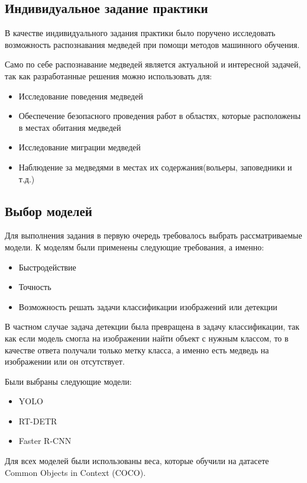 \documentclass[../document.tex]{subfiles}
\begin{document}
    \subsection{Индивидуальное задание практики}
    \par В качестве индивидуального задания практики было поручено исследовать возможность распознавания медведей при помощи методов машинного обучения.
    \par Само по себе распознавание медведей является актуальной и интересной задачей, так как разработанные решения можно использовать для:
    \begin{itemize}
    	\item Исследование поведения медведей
    	\item Обеспечение безопасного проведения работ в областях, которые расположены в местах обитания медведей
    	\item Исследование миграции медведей
    	\item Наблюдение за медведями в местах их содержания(вольеры, заповедники и т.д.)
    \end{itemize}
    
    \subsection{Выбор моделей}
    \par Для выполнения задания в первую очередь требовалось выбрать рассматриваемые модели. К моделям были применены следующие требования, а именно:
    \begin{itemize}
    	\item Быстродействие
    	\item Точность
    	\item Возможность решать задачи классификации изображений или детекции
    \end{itemize}
    \par В частном случае задача детекции была превращена в задачу классификации, так как если модель смогла на изображении найти объект с нужным классом, то в качестве ответа получали только метку класса, а именно есть медведь на изображении или он отсутствует.
    \par Были выбраны следующие модели:
    \begin{itemize}
    	\item YOLO
    	\item RT-DETR
    	\item Faster R-CNN
    \end{itemize}
    \par Для всех моделей были использованы веса, которые обучили на датасете Common Objects in Context (COCO).
    
\end{document}
